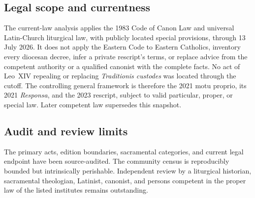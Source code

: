 {\subsection{Legal scope and currentness}

The current-law analysis applies the 1983 Code of Canon Law and universal Latin-Church liturgical law, with publicly located special provisions, through 13 July 2026. It does not apply the Eastern Code to Eastern Catholics, inventory every diocesan decree, infer a private rescript's terms, or replace advice from the competent authority or a qualified canonist with the complete facts. No act of Leo~XIV repealing or replacing \emph{Traditionis custodes} was located through the cutoff. The controlling general framework is therefore the 2021 motu proprio, its 2021 \emph{Responsa}, and the 2023 rescript, subject to valid particular, proper, or special law. Later competent law supersedes this snapshot.

\subsection{Audit and review limits}

The primary acts, edition boundaries, sacramental categories, and current legal endpoint have been source-audited. The community census is reproducibly bounded but intrinsically perishable. Independent review by a liturgical historian, sacramental theologian, Latinist, canonist, and persons competent in the proper law of the listed institutes remains outstanding.
}
